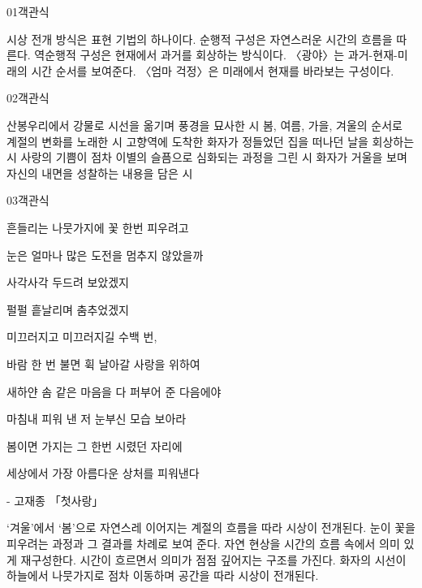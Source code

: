 \documentclass[fs9,seriesRus]{korfarm-base}
\begin{document}
\par\medskip
\kfBeginMC
\begin{kfQBlock}{01}{객관식}
\begin{kfChoices}
\kfChoice 시상 전개 방식은 표현 기법의 하나이다.
\kfChoice 순행적 구성은 자연스러운 시간의 흐름을 따른다.
\kfChoice 역순행적 구성은 현재에서 과거를 회상하는 방식이다.
\kfChoice 〈광야〉는 과거-현재-미래의 시간 순서를 보여준다.
\kfChoice 〈엄마 걱정〉은 미래에서 현재를 바라보는 구성이다.
\end{kfChoices}
\end{kfQBlock}
\begin{kfQBlock}{02}{객관식}
\begin{kfChoices}
\kfChoice 산봉우리에서 강물로 시선을 옮기며 풍경을 묘사한 시
\kfChoice 봄, 여름, 가을, 겨울의 순서로 계절의 변화를 노래한 시
\kfChoice 고향역에 도착한 화자가 정들었던 집을 떠나던 날을 회상하는 시
\kfChoice 사랑의 기쁨이 점차 이별의 슬픔으로 심화되는 과정을 그린 시
\kfChoice 화자가 거울을 보며 자신의 내면을 성찰하는 내용을 담은 시
\end{kfChoices}
\end{kfQBlock}
\begin{kfQBlock}{03}{객관식}
\begin{kfEvidence}흔들리는 나뭇가지에 꽃 한번 피우려고

눈은 얼마나 많은 도전을 멈추지 않았을까

사각사각 두드려 보았겠지

펄펄 흩날리며 춤추었겠지

미끄러지고 미끄러지길 수백 번,

바람 한 번 불면 휙 날아갈 사랑을 위하여

새하얀 솜 같은 마음을 다 퍼부어 준 다음에야

마침내 피워 낸 저 눈부신 모습 보아라

봄이면 가지는 그 한번 시렸던 자리에

세상에서 가장 아름다운 상처를 피워낸다

- 고재종 「첫사랑」\end{kfEvidence}
\begin{kfChoices}
\kfChoice ‘겨울’에서 ‘봄’으로 자연스레 이어지는 계절의 흐름을 따라 시상이 전개된다.
\kfChoice 눈이 꽃을 피우려는 과정과 그 결과를 차례로 보여 준다.
\kfChoice 자연 현상을 시간의 흐름 속에서 의미 있게 재구성한다.
\kfChoice 시간이 흐르면서 의미가 점점 깊어지는 구조를 가진다.
\kfChoice 화자의 시선이 하늘에서 나뭇가지로 점차 이동하며 공간을 따라 시상이 전개된다.
\end{kfChoices}
\end{kfQBlock}
\end{document}
